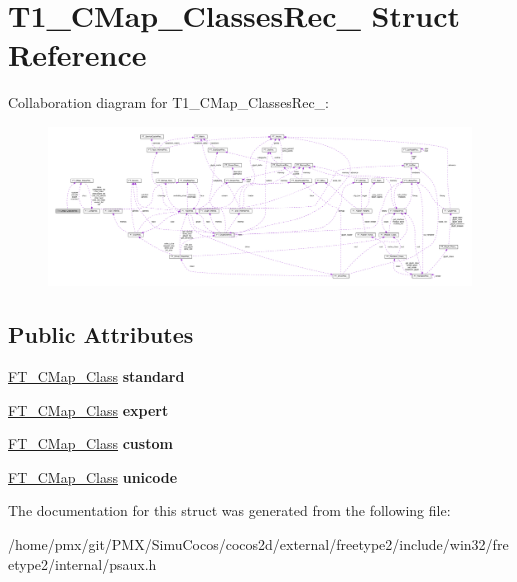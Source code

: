 \hypertarget{structT1__CMap__ClassesRec__}{}\section{T1\+\_\+\+C\+Map\+\_\+\+Classes\+Rec\+\_\+ Struct Reference}
\label{structT1__CMap__ClassesRec__}


Collaboration diagram for T1\+\_\+\+C\+Map\+\_\+\+Classes\+Rec\+\_\+\+:
\nopagebreak
\begin{figure}[H]
\begin{center}
\leavevmode
\includegraphics[width=350pt]{structT1__CMap__ClassesRec____coll__graph}
\end{center}
\end{figure}
\subsection*{Public Attributes}
\begin{DoxyCompactItemize}
\item 
\mbox{\label{structT1__CMap__ClassesRec___a11bc9e986af1c0cf91bd67e2e30028ca}} 
\hyperlink{structFT__CMap__ClassRec__}{F\+T\+\_\+\+C\+Map\+\_\+\+Class} {\bfseries standard}
\item 
\mbox{\label{structT1__CMap__ClassesRec___a9576c404d5197dd66498725eacde1302}} 
\hyperlink{structFT__CMap__ClassRec__}{F\+T\+\_\+\+C\+Map\+\_\+\+Class} {\bfseries expert}
\item 
\mbox{\label{structT1__CMap__ClassesRec___a21378ef457d58cc00f357011f45fba5e}} 
\hyperlink{structFT__CMap__ClassRec__}{F\+T\+\_\+\+C\+Map\+\_\+\+Class} {\bfseries custom}
\item 
\mbox{\label{structT1__CMap__ClassesRec___aab1eef66893dd7b0d25897612d056d4a}} 
\hyperlink{structFT__CMap__ClassRec__}{F\+T\+\_\+\+C\+Map\+\_\+\+Class} {\bfseries unicode}
\end{DoxyCompactItemize}


The documentation for this struct was generated from the following file\+:\begin{DoxyCompactItemize}
\item 
/home/pmx/git/\+P\+M\+X/\+Simu\+Cocos/cocos2d/external/freetype2/include/win32/freetype2/internal/psaux.\+h\end{DoxyCompactItemize}
